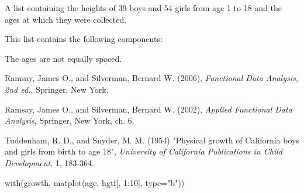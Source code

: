 \begin{Description}\relax
A list containing the heights of 39 boys and 54 girls from age 1 to 18
and the ages at which they were collected.
\end{Description}
\begin{Format}\relax
This list contains the following components:
\end{Format}
\begin{Details}\relax
The ages are not equally spaced.
\end{Details}
\begin{Source}\relax
Ramsay, James O., and Silverman, Bernard W. (2006), \emph{Functional
Data Analysis, 2nd ed.}, Springer, New York. 

Ramsay, James O., and Silverman, Bernard W. (2002), \emph{Applied
Functional Data Analysis}, Springer, New York, ch. 6. 

Tuddenham, R. D., and Snyder, M. M. (1954) "Physical growth of
California boys and girls from birth to age 18", \emph{University of
California Publications in Child Development}, 1, 183-364.
\end{Source}
\begin{Examples}
\begin{ExampleCode}
with(growth, matplot(age, hgtf[, 1:10], type="b"))
\end{ExampleCode}
\end{Examples}


